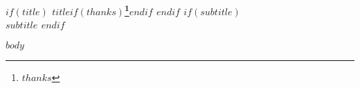 \documentclass{article}%
\begin{document}

\begin{center}
\textbf{$if(title)$ $title$$if(thanks)$\thanks{$thanks$}$endif$ $endif$ $if(subtitle)$\\ $subtitle$ $endif$} 
\end{center}

$body$
\end{document}
